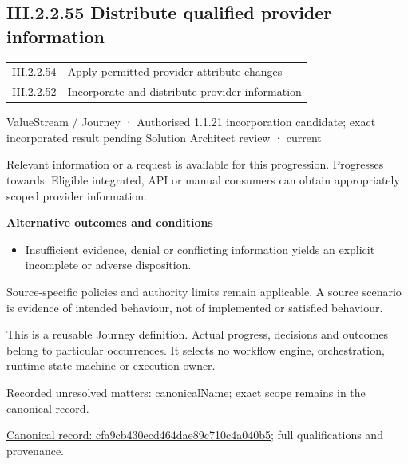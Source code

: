 \subsection*{III.2.2.55 Distribute qualified provider information}
\label{navigation:III.2.2.55}

\begin{longtable}{p{.22\linewidth}p{.73\linewidth}}
III.2.2.54 & \hyperref[element:1ceb340083984b9fbe393532c69abe72]{Apply permitted provider attribute changes} \\
III.2.2.52 & \hyperref[element:9eb9f3210d5e4b46ac21463f54e62ab9]{Incorporate and distribute provider information} \\
\end{longtable}
\label{element:cfa9cb430ecd464dae89c710c4a040b5}
{\small ValueStream / Journey · Authorised 1.1.21 incorporation candidate; exact incorporated result pending Solution Architect review · current}\par

Relevant information or a request is available for this progression. Progresses towards: Eligible integrated, API or manual consumers can obtain appropriately scoped provider information.



\par\medskip\textbf{Alternative outcomes and conditions}\par


\begin{itemize}


\item Insufficient evidence, denial or conflicting information yields an explicit incomplete or adverse disposition.

\end{itemize}


Source-specific policies and authority limits remain applicable. A source scenario is evidence of intended behaviour, not of implemented or satisfied behaviour.



This is a reusable Journey definition. Actual progress, decisions and outcomes belong to particular occurrences. It selects no workflow engine, orchestration, runtime state machine or execution owner.


{\small Recorded unresolved matters: canonicalName; exact scope remains in the canonical record.}\par
{\footnotesize \href{../../../../../../../continuum/strategy/value-stream/cfa9cb430ecd464dae89c710c4a040b5.md}{Canonical record: cfa9cb430ecd464dae89c710c4a040b5}; full qualifications and provenance.}\par
